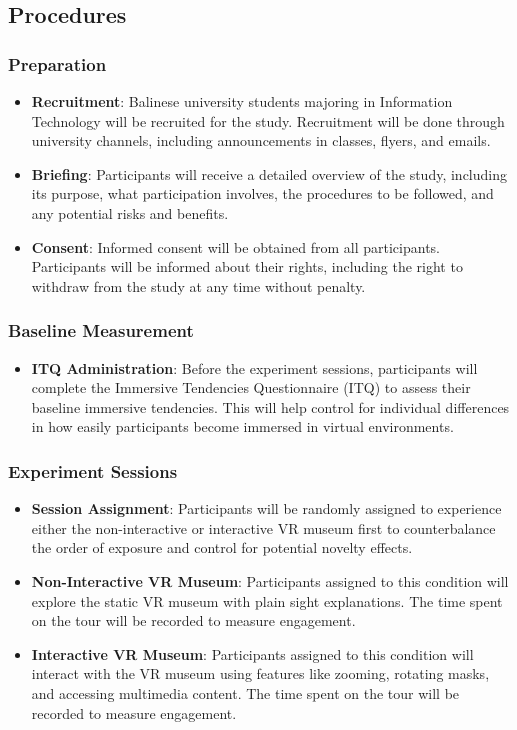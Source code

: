 \documentclass[conference]{IEEEtran}
\begin{document}
\subsection{Procedures}
\subsubsection{Preparation}
\begin{itemize}
    \item \textbf{Recruitment}: Balinese university students majoring in Information Technology will be recruited for the study. Recruitment will be done through university channels, including announcements in classes, flyers, and emails.
    \item \textbf{Briefing}: Participants will receive a detailed overview of the study, including its purpose, what participation involves, the procedures to be followed, and any potential risks and benefits.
    \item \textbf{Consent}: Informed consent will be obtained from all participants. Participants will be informed about their rights, including the right to withdraw from the study at any time without penalty.
\end{itemize}
\subsubsection{Baseline Measurement}
\begin{itemize}
    \item \textbf{ITQ Administration}: Before the experiment sessions, participants will complete the Immersive Tendencies Questionnaire (ITQ) to assess their baseline immersive tendencies. This will help control for individual differences in how easily participants become immersed in virtual environments.
\end{itemize}
\subsubsection{Experiment Sessions}
\begin{itemize}
    \item \textbf{Session Assignment}: Participants will be randomly assigned to experience either the non-interactive or interactive VR museum first to counterbalance the order of exposure and control for potential novelty effects.
    \item \textbf{Non-Interactive VR Museum}: Participants assigned to this condition will explore the static VR museum with plain sight explanations. The time spent on the tour will be recorded to measure engagement.
    \item \textbf{Interactive VR Museum}: Participants assigned to this condition will interact with the VR museum using features like zooming, rotating masks, and accessing multimedia content. The time spent on the tour will be recorded to measure engagement.
\end{itemize}
\end{document}
